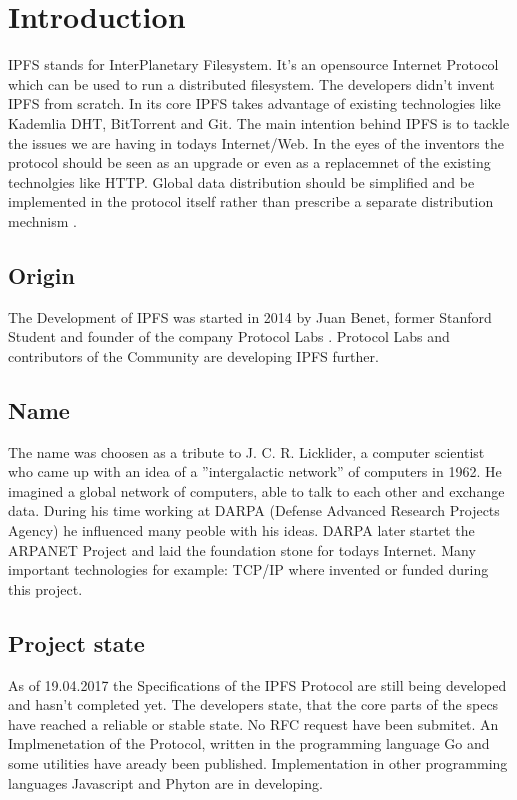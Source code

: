 \documentclass[a4paper,11pt, oneside]{report}
\theoremstyle{definition}
\begin{document}
\chapter{Introduction}
IPFS stands for InterPlanetary Filesystem. It's an opensource Internet Protocol which can be used to run a distributed filesystem.
The developers didn't invent IPFS from scratch. In its core IPFS takes advantage of existing technologies like Kademlia DHT, BitTorrent and Git. The main intention behind IPFS is to tackle the issues  we are having in todays Internet/Web. In the eyes of the inventors the protocol should be seen as an upgrade or even as a replacemnet of the existing technolgies like HTTP. Global data distribution should be simplified and be implemented in the protocol itself rather than prescribe a separate distribution mechnism \cite{IPFSBasics}.

\section{Origin}
The Development of IPFS was started in 2014 by Juan Benet, former Stanford Student and founder of the company Protocol Labs . Protocol Labs and contributors of the Community are developing IPFS further.

\section{Name}
The name was choosen as a tribute to J. C. R. Licklider, a computer scientist who came up with an idea of a ''intergalactic network'' of computers in 1962. He imagined a global network of computers, able to talk to each other and exchange data. During his time working at DARPA (Defense Advanced Research Projects Agency) he influenced many peoble with his ideas. DARPA later startet the ARPANET Project and laid the foundation stone for todays Internet. Many important technologies for example: TCP/IP where invented or funded during this project. 

\newpage
\section{Project state}
As of 19.04.2017 the Specifications of the IPFS Protocol are still being developed and hasn't completed yet. The developers state, that the
 core parts of the specs have reached a reliable or stable state. No RFC request have been submitet. An Implmenetation of the Protocol, written in the programming language Go and some utilities have aready been published. Implementation in other programming languages Javascript and Phyton are in developing.\\
\end{document}
